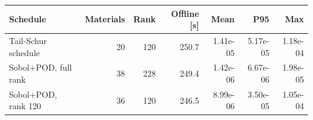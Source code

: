 \begin{tabular}{lrrrrrr}
\toprule
Schedule & Materials & Rank & Offline [s] & Mean & P95 & Max \\
\midrule
Tail-Schur schedule & 20 & 120 & 250.7 & 1.41e-05 & 5.17e-05 & 1.18e-04 \\
Sobol+POD, full rank & 38 & 228 & 249.4 & 1.42e-06 & 6.67e-06 & 1.98e-05 \\
Sobol+POD, rank 120 & 36 & 120 & 246.5 & 8.99e-06 & 3.50e-05 & 1.05e-04 \\
\bottomrule
\end{tabular}

